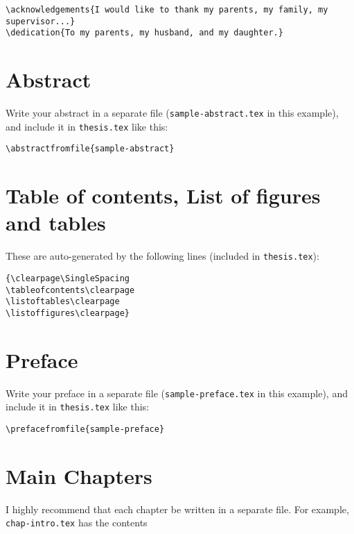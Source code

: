 \medskip

\begin{lstlisting}
\acknowledgements{I would like to thank my parents, my family, my supervisor...}
\dedication{To my parents, my husband, and my daughter.}
\end{lstlisting}

\section{Abstract}\label{sec:abstract}
Write your abstract in a separate file (\texttt{sample-abstract.tex} in this example), and include it in \texttt{thesis.tex} like this:

\begin{lstlisting}[moretexcs={abstractfromfile}]
\abstractfromfile{sample-abstract}
\end{lstlisting}


\section{Table of contents, List of figures and tables}\label{sec:toc}

These are auto-generated by the following lines (included in \texttt{thesis.tex}):

\begin{lstlisting}[moretexcs={SingleSpacing,tableofcontents,listoftables,listoffigures}]
{\clearpage\SingleSpacing
\tableofcontents\clearpage
\listoftables\clearpage
\listoffigures\clearpage}
\end{lstlisting}

\section{Preface}\label{sec:preface}
Write your preface in a separate file (\texttt{sample-preface.tex} in this example), and include it in \texttt{thesis.tex} like this:

\begin{lstlisting}[moretexcs={prefacefromfile}]
\prefacefromfile{sample-preface}
\end{lstlisting}


\section{Main Chapters}\label{sec:chapters}

I highly recommend that each chapter be written in a separate file. For example, \texttt{chap-intro.tex} has the contents

